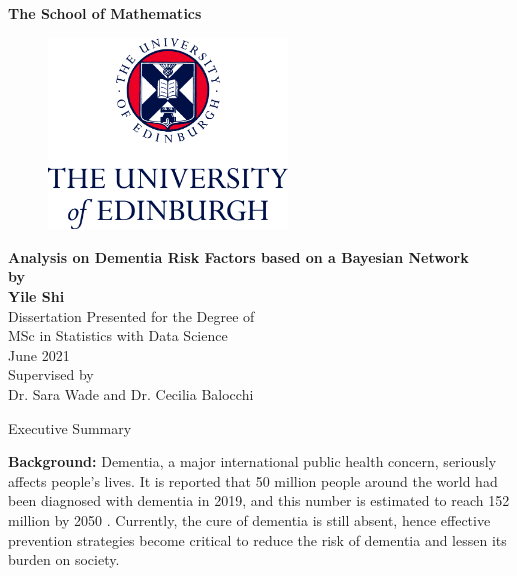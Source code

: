 \documentclass[11pt,twoside]{article}
\numberwithin{Theorem}{section}
\numberwithin{Definition}{section}
\numberwithin{Lemma}{section}
\numberwithin{Algorithm}{section}
\numberwithin{equation}{section}
\begin{document}
	
\pagestyle{empty}

\begin{titlepage}
\vspace*{.5em}
\centering
\textbf{\Large{The School of Mathematics}} \\
\vspace*{1em}
\begin{figure}[!h]
\centering
\includegraphics[width=180pt]{CentredLogoCMYK.jpg}
\end{figure}
\vspace{2em}
\textbf{\Huge{Analysis on Dementia Risk Factors based on a Bayesian Network}}\\[2em]
\textbf{\LARGE{by}}\\
\vspace{2em}
\textbf{\LARGE{Yile Shi}}\\
\vspace{6.5em}
\Large{Dissertation Presented for the Degree of\\
MSc in Statistics with Data Science}\\
\vspace{6.5em}
\Large{June 2021}\\
\vspace{3em}
\Large{Supervised by\\Dr. Sara Wade and Dr. Cecilia Balocchi}
\vfill
\end{titlepage}

\clearpage

\begin{center}
\Large{Executive Summary}
\end{center}

\textbf{Background:} Dementia, a major international public health concern, seriously affects people's lives. It is reported that 50 million people around the world had been diagnosed with dementia in 2019, and this number is estimated to reach 152 million by 2050 \cite{alzheimer2019world}. Currently, the cure of dementia is still absent, hence effective prevention strategies become critical to reduce the risk of dementia and lessen its burden on society. 
\end{document}
